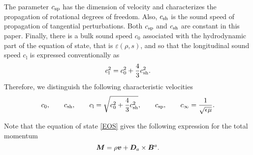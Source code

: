 \documentclass[
10pt, %
a4paper, %
oneside, %
headinclude,footinclude, %
table
]{scrartcl}
\begin{document}
The parameter $ c_\text{sp} $ has the dimension of velocity and characterizes 
the propagation of rotational degrees of freedom. Also, $ c_\text{sh} $ is the sound 
speed of propagation of tangential perturbations. Both $ c_\text{sp} $ and $ c_\text{sh} $ 
are constant in this paper. Finally, there is a bulk 
sound speed $ c_0 $ associated with the hydrodynamic part of the equation of 
state, that is $ \varepsilon(\rho,s) $, and so that the longitudinal sound 
speed $ c_\text{l} $ is expressed conventionally as
\begin{equation}\label{long.sound}
c_\text{l}^2 = c_0^2 + \frac43 c_\text{sh}^2. 
\end{equation}
Therefore, we distinguish the following  characteristic velocities
\begin{equation}\label{key}
c_0, \qquad c_\text{sh}, \qquad c_\text{l} = \sqrt{c_0^2 + \frac43 c_\text{sh}^2}, 
\qquad c_\text{sp}, \qquad c_\infty = \frac{1}{\sqrt{\epsilon\mu}}.
\end{equation}

Note that the equation of state \eqref{EOS} gives the following expression for 
the total momentum 
\begin{equation}\label{momentum.total}
\bm{M} =\rho \bm{v} + \bm{D}_a\times\bm{B}^a.
\end{equation}
\end{document}
